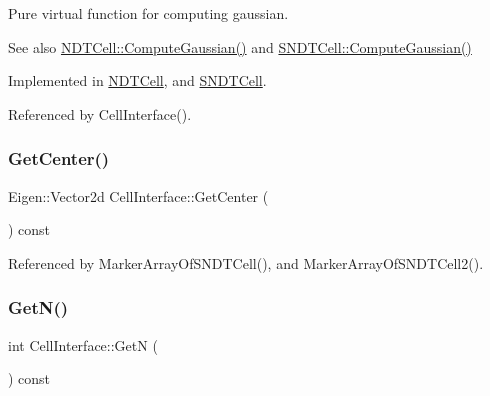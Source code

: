 Pure virtual function for computing gaussian. 

\begin{DoxySeeAlso}{See also}
\hyperlink{classNDTCell_a45a92594eb74881f3684c84c4bdfa91e}{N\+D\+T\+Cell\+::\+Compute\+Gaussian()} and \hyperlink{classSNDTCell_a86aa415947d71974d4a57920bb02fe1b}{S\+N\+D\+T\+Cell\+::\+Compute\+Gaussian()} 
\end{DoxySeeAlso}


Implemented in \hyperlink{classNDTCell_a45a92594eb74881f3684c84c4bdfa91e}{N\+D\+T\+Cell}, and \hyperlink{classSNDTCell_a86aa415947d71974d4a57920bb02fe1b}{S\+N\+D\+T\+Cell}.



Referenced by Cell\+Interface().

\mbox{\label{classCellInterface_a30f7080f19cd592cc0c478d910870858}} 
\subsubsection{\texorpdfstring{Get\+Center()}{GetCenter()}}
{\footnotesize\ttfamily Eigen\+::\+Vector2d Cell\+Interface\+::\+Get\+Center (\begin{DoxyParamCaption}{ }\end{DoxyParamCaption}) const\hspace{0.3cm}{\ttfamily [inline]}}



Referenced by Marker\+Array\+Of\+S\+N\+D\+T\+Cell(), and Marker\+Array\+Of\+S\+N\+D\+T\+Cell2().

\mbox{\label{classCellInterface_a26eed7e87ee176e0f4fd256711d6dbfe}} 
\subsubsection{\texorpdfstring{Get\+N()}{GetN()}}
{\footnotesize\ttfamily int Cell\+Interface\+::\+GetN (\begin{DoxyParamCaption}{ }\end{DoxyParamCaption}) const\hspace{0.3cm}{\ttfamily [inline]}}

\mbox{\label{classCellInterface_aca65971da680ab3e5f7e68d5444b50f8}} 
